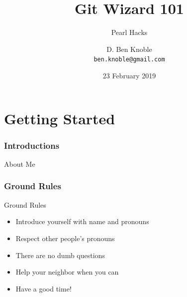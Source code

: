 \documentclass{beamer}
\title{Git Wizard 101}
\subtitle{Pearl Hacks}
\author{D. Ben Knoble \\ \texttt{ben.knoble@gmail.com}}
\institute{UNC Chapel Hill}
\date{23 February 2019}
\theoremstyle{example}
\begin{document}

\frame{\titlepage}

\part{Getting Started}
\frame{\partpage}
\frame{\tableofcontents[part=1]}

\section{Introductions}
\begin{frame}{About Me}
\end{frame}
\begin{frame}
\end{frame}

\section{Ground Rules}
\begin{frame}{Ground Rules}
    \begin{itemize}
        \item Introduce yourself with name and pronouns
        \item Respect other people’s pronouns
        \item There are no dumb questions
        \item Help your neighbor when you can
        \item Have a good time!
    \end{itemize}
\end{frame}
\end{document}
